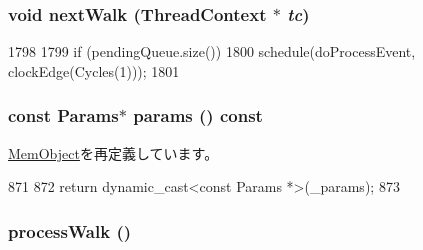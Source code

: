\hypertarget{classArmISA_1_1TableWalker_ae126e9ab023c3e4659836daa8f5364be}{
\subsubsection[{nextWalk}]{\setlength{\rightskip}{0pt plus 5cm}void nextWalk ({\bf ThreadContext} $\ast$ {\em tc})}}
\label{classArmISA_1_1TableWalker_ae126e9ab023c3e4659836daa8f5364be}



\begin{DoxyCode}
1798 {
1799     if (pendingQueue.size())
1800         schedule(doProcessEvent, clockEdge(Cycles(1)));
1801 }
\end{DoxyCode}
\hypertarget{classArmISA_1_1TableWalker_acd3c3feb78ae7a8f88fe0f110a718dff}{
\subsubsection[{params}]{\setlength{\rightskip}{0pt plus 5cm}const {\bf Params}$\ast$ params () const}}
\label{classArmISA_1_1TableWalker_acd3c3feb78ae7a8f88fe0f110a718dff}


\hyperlink{classMemObject_acd3c3feb78ae7a8f88fe0f110a718dff}{MemObject}を再定義しています。


\begin{DoxyCode}
871     {
872         return dynamic_cast<const Params *>(_params);
873     }
\end{DoxyCode}
\hypertarget{classArmISA_1_1TableWalker_a13d6e703bfb2074a12535d21689a16d5}{
\subsubsection[{processWalk}]{ processWalk ()}}
\label{classArmISA_1_1TableWalker_a13d6e703bfb2074a12535d21689a16d5}



